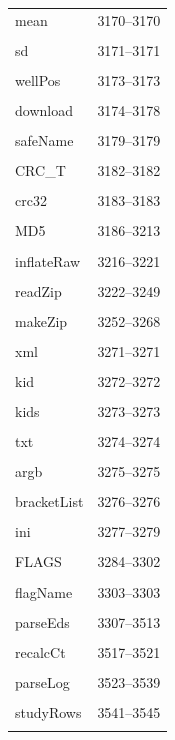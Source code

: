 {\begin{longtable}{@{}p{11cm}r@{}}
mean & 3170--3170 \\\\\hline
sd & 3171--3171 \\\\\hline
wellPos & 3173--3173 \\\\\hline
download & 3174--3178 \\\\\hline
safeName & 3179--3179 \\\\\hline
CRC\_T & 3182--3182 \\\\\hline
crc32 & 3183--3183 \\\\\hline
MD5 & 3186--3213 \\\\\hline
inflateRaw & 3216--3221 \\\\\hline
readZip & 3222--3249 \\\\\hline
makeZip & 3252--3268 \\\\\hline
xml & 3271--3271 \\\\\hline
kid & 3272--3272 \\\\\hline
kids & 3273--3273 \\\\\hline
txt & 3274--3274 \\\\\hline
argb & 3275--3275 \\\\\hline
bracketList & 3276--3276 \\\\\hline
ini & 3277--3279 \\\\\hline
FLAGS & 3284--3302 \\\\\hline
flagName & 3303--3303 \\\\\hline
parseEds & 3307--3513 \\\\\hline
recalcCt & 3517--3521 \\\\\hline
parseLog & 3523--3539 \\\\\hline
studyRows & 3541--3545 \\\\\hline

\end{longtable}}
